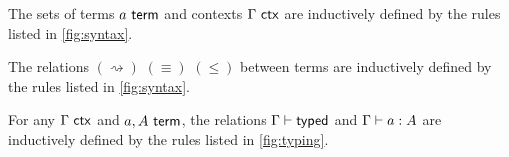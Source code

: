 \documentclass[twoside]{report}
\begin{document}
\begin{definition}[Syntax]
\label{def:syntax}
The sets of terms $a \ \mathsf{term}$ and contexts $\Gamma \ \mathsf{ctx}$ are inductively defined by the rules listed in \cref{fig:syntax}.
\end{definition}

\begin{definition}
\label{def:conversion}
The relations $(\rightsquigarrow)$ $(\equiv)$ $(\leq)$ between terms are inductively defined by the rules listed in \cref{fig:syntax}.
\end{definition}

\begin{definition}
\label{def:typing}
For any $\Gamma \ \mathsf{ctx}$ and $a, A \ \mathsf{term}$, the relations $\Gamma \vdash \mathsf{typed}$ and $\Gamma \vdash a : A$ are inductively defined by the rules listed in \cref{fig:typing}.
\end{definition}
\end{document}
